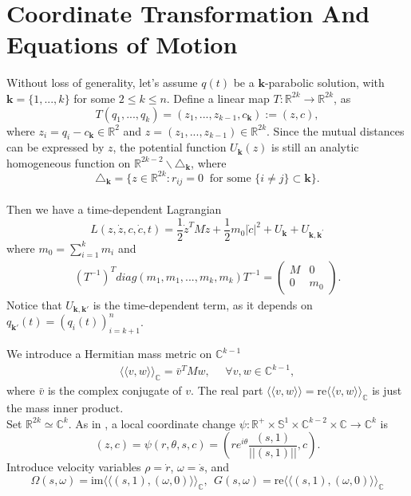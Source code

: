 \documentclass[11pt]{amsart}
\theoremstyle{definition}
\theoremstyle{remark}
\numberwithin{equation}{section}
\newcommand{\rr}{\mathbb R}
\newcommand{\bk}{\mathbf k}
\begin{document}



\section{Coordinate Transformation And Equations of Motion} \label{sec;co-tran}
Without loss of generality, let's assume $q(t)$ be a $\bk$-parabolic solution, with $\mathbf{k}=\{1,...,k\}$ for some $2\le k \le n$. Define a linear map $T:\mathbb{R}^{2k}\rightarrow\mathbb{R}^{2k}$, as 
$$ T(q_1,...,q_k)=(z_1,...,z_{k-1},c_\mathbf{k}):=(z,c), $$
where $z_i=q_i-c_\mathbf{k}\in\mathbb{R}^2$ and $z=(z_1,...,z_{k-1}) \in \rr^{2k}$. Since the mutual distances can be expressed by $z$, the potential function $U_\mathbf{k}(z)$ is still an analytic homogeneous function on $\mathbb{R}^{2k-2}\backslash\triangle_\mathbf{k}$, where 
 $$ \triangle_\mathbf{k}=\{z \in \rr^{2k}:r_{ij}=0\ \text{ for some } \{ i\neq j\} \subset \bk \}. $$
\\ \indent Then we have a time-dependent Lagrangian 
\begin{equation*}
    L(z,\dot{z},c,\dot{c},t)=\frac{1}{2}\dot{z}^TM\dot{z}+\frac{1}{2}m_0|\dot{c}|^2+U_\mathbf{k}+U_{\mathbf{k},\mathbf{k}^\prime}
\end{equation*}
where $m_0=\sum^k_{i=1}m_i$ and
\begin{align*}
    (T^{-1})^Tdiag(m_1,m_1,...,m_k,m_k)T^{-1}=
    \begin{pmatrix}
        M & 0 \\
        0 & m_0 
    \end{pmatrix}.
\end{align*}
Notice that $U_{\bk, \bk'}$ is the time-dependent term, as it depends on $q_{\bk'}(t) =(q_i(t))_{i =k+1}^n$. 

We introduce a Hermitian mass metric on $\mathbb{C}^{k-1}$
\begin{align*}
    \langle\langle v,w\rangle\rangle_{\mathbb{C}}=\bar{v}^TMw,\ \ \ \ \ \ \forall v,w\in\mathbb{C}^{k-1},
\end{align*}
where $\bar{v}$ is the complex conjugate of $v$. The real part $\langle\langle v,w\rangle\rangle= \text{re}\langle\langle v,w\rangle\rangle_{\mathbb{C}}$ is just the mass inner product.\\

Set $\mathbb{R}^{2k} \simeq \mathbb{C}^{k}$. As in \cite{MM25}, a local coordinate change $\psi:\mathbb{R}^+\times\mathbb{S}^1\times\mathbb{C}^{k-2}\times\mathbb{C}\rightarrow\mathbb{C}^{k}$ is 
$$ (z,c)=\psi(r,\theta,s,c)=(re^{i\theta}\frac{(s,1)}{||(s,1)||},c).$$
Introduce velocity variables $\rho=\dot{r}$, $\omega=\dot{s}$, and 
$$  \Omega(s,\omega)=\text{im}\langle\langle(s,1),(\omega,0)\rangle\rangle_{\mathbb{C}},\ \ G(s,\omega)=\text{re}\langle\langle(s,1),(\omega,0)\rangle\rangle_{\mathbb{C}} $$
\end{document}
